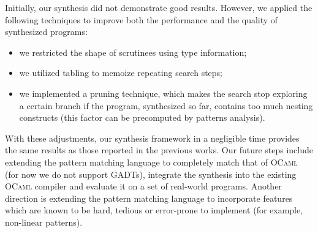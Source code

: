 \documentclass[submission,copyright,creativecommons]{eptcs}
\begin{document}
Initially, our synthesis did not demonstrate good results. However, we applied the following techniques to improve both the performance
and the quality of synthesized programs:

\begin{itemize}
\item we restricted the shape of scrutinees using type information;
\item we utilized tabling to memoize repeating search steps;
\item we implemented a pruning technique, which makes the search stop exploring a certain branch if the program, synthesized so far,
  contains too much nesting constructs (this factor can be precomputed by patterns analysis).
\end{itemize}

With these adjustments, our synthesis framework in a negligible time provides the same results as those reported in the previous works.
Our future steps include extending the pattern matching language to completely match that of \textsc{OCaml} (for
now we do not support GADTs), integrate the synthesis into the existing \textsc{OCaml} compiler and evaluate it on a
set of real-world programs. Another direction is extending the pattern matching language to incorporate features which
are known to be hard, tedious or error-prone to implement (for example, non-linear patterns).
\end{document}
